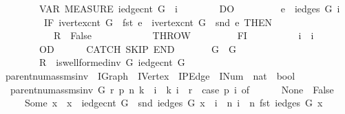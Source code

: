 \begin{isabellebody}
\ \ \ \ \ \ \ \ VAR\ MEASURE\ {\isacharparenleft}iedge{\isacharunderscore}cnt\ {\isasymacute}G\ {\isacharminus}\ {\isasymacute}i{\isacharparenright}\isanewline
\ \ \ \ \ \ \ \ DO\isanewline
\ \ \ \ \ \ \ \ \ {\isasymacute}e\ {\isacharcolon}{\isacharequal}{\isacharequal}\ iedges\ {\isasymacute}G\ {\isasymacute}i\ {\isacharsemicolon}{\isacharsemicolon}\isanewline
\ \ \ \ \ \ \ \ \ IF\ ivertex{\isacharunderscore}cnt\ {\isasymacute}G\ {\isasymle}\ fst\ {\isasymacute}e\ {\isasymor}\ ivertex{\isacharunderscore}cnt\ {\isasymacute}G\ {\isasymle}\ snd\ {\isasymacute}e\ THEN\isanewline
\ \ \ \ \ \ \ \ \ \ \ {\isasymacute}R\ {\isacharcolon}{\isacharequal}{\isacharequal}\ False\ {\isacharsemicolon}{\isacharsemicolon}\isanewline
\ \ \ \ \ \ \ \ \ \ \ THROW\isanewline
\ \ \ \ \ \ \ \ \ FI\ {\isacharsemicolon}{\isacharsemicolon}\isanewline
\ \ \ \ \ \ \ \ \ {\isasymacute}i\ {\isacharcolon}{\isacharequal}{\isacharequal}\ {\isasymacute}i\ {\isacharplus}\ {}\isanewline
\ \ \ \ \ \ \ \ OD\isanewline
\ \ \ \ \ \ CATCH\ SKIP\ END\isanewline
\ \ \ \ \ \ {\isasymlbrace}\ {\isasymacute}G\ {\isacharequal}\ G\ {\isasymand}\ \isanewline
\ \ \ \ \ \ \ \ {\isasymacute}R\ {\isacharequal}\ is{\isacharunderscore}wellformed{\isacharunderscore}inv\ {\isasymacute}G\ {\isacharparenleft}iedge{\isacharunderscore}cnt\ {\isasymacute}G{\isacharparenright}\ {\isasymrbrace}{\isachardoublequoteclose}\isanewline
\isanewline
{}\isamarkupfalse%
\ parent{\isacharunderscore}num{\isacharunderscore}assms{\isacharunderscore}inv\ {\isacharcolon}{\isacharcolon}\ {\isachardoublequoteopen}IGraph\ {\isasymRightarrow}\ IVertex\ {\isasymRightarrow}\ IPEdge\ {\isasymRightarrow}\ INum\ {\isasymRightarrow}\ nat\ {\isasymRightarrow}\ bool{\isachardoublequoteclose}\ \isanewline
\ \ {\isachardoublequoteopen}parent{\isacharunderscore}num{\isacharunderscore}assms{\isacharunderscore}inv\ G\ r\ p\ n\ k\ {\isasymequiv}\ {\isasymforall}i\ {\isacharless}\ k{\isachardot}\ i\ {\isasymnoteq}\ r\ {\isasymlongrightarrow}\ {\isacharparenleft}case\ p\ i\ of\isanewline
\ \ \ \ \ \ None\ {\isasymRightarrow}\ False\isanewline
\ \ \ \ {\isacharbar}\ Some\ x\ {\isasymRightarrow}\ x\ {\isacharless}\ iedge{\isacharunderscore}cnt\ G\ {\isasymand}\ snd\ {\isacharparenleft}iedges\ G\ x{\isacharparenright}\ {\isacharequal}\ i\ {\isasymand}\ n\ i\ {\isacharequal}\ n\ {\isacharparenleft}fst\ {\isacharparenleft}iedges\ G\ x{\isacharparenright}{\isacharparenright}\ {\isacharplus}\ {}{\isacharparenright}{\isachardoublequoteclose}\isanewline
\isanewline
{}\isamarkupfalse%

\end{isabellebody}
